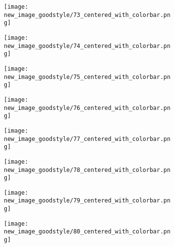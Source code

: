 \documentclass[a4paper,12pt]{article}
\begin{document}
\begin{figure}[H]
  \begin{subfigure}{0.11\textwidth}
    \texttt{[image: new\_image\_goodstyle/73\_centered\_with\_colorbar.png]}
  \end{subfigure}
  \hfill
  \begin{subfigure}{0.11\textwidth}
    \texttt{[image: new\_image\_goodstyle/74\_centered\_with\_colorbar.png]}
  \end{subfigure}
  \hfill
  \begin{subfigure}{0.11\textwidth}
    \texttt{[image: new\_image\_goodstyle/75\_centered\_with\_colorbar.png]}
  \end{subfigure}
  \hfill
  \begin{subfigure}{0.11\textwidth}
    \texttt{[image: new\_image\_goodstyle/76\_centered\_with\_colorbar.png]}
  \end{subfigure}
  \hfill
  \begin{subfigure}{0.11\textwidth}
    \texttt{[image: new\_image\_goodstyle/77\_centered\_with\_colorbar.png]}
  \end{subfigure}
  \hfill
  \begin{subfigure}{0.11\textwidth}
    \texttt{[image: new\_image\_goodstyle/78\_centered\_with\_colorbar.png]}
  \end{subfigure}
  \hfill
  \begin{subfigure}{0.11\textwidth}
    \texttt{[image: new\_image\_goodstyle/79\_centered\_with\_colorbar.png]}
  \end{subfigure}
  \hfill
  \begin{subfigure}{0.11\textwidth}
    \texttt{[image: new\_image\_goodstyle/80\_centered\_with\_colorbar.png]}
  \end{subfigure}
  \hfill
\end{figure}
\end{document}
